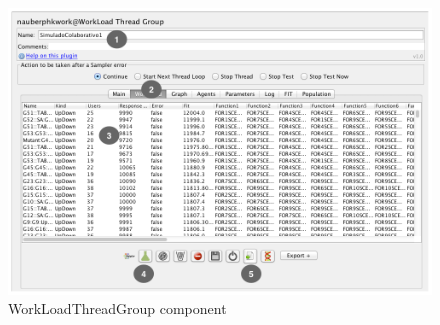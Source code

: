 \documentclass{bmcart}
\begin{document}
\begin{backmatter}
\begin{figure}[h]
\centering
\includegraphics{./images/tela1iadapter.png}
\caption{WorkLoadThreadGroup component}
\label{fig:tela1iadapter}
\end{figure}


\end{backmatter}
\end{document}
